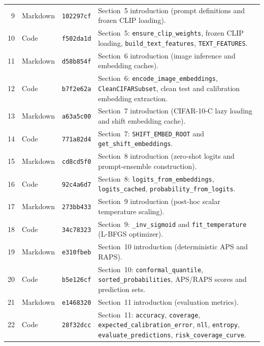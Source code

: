 \documentclass[11pt,a4paper]{article}
\begin{document}
{\begin{longtable}{r l l P{0.64\textwidth}}
9 & Markdown & \texttt{102297cf} & Section~5 introduction (prompt definitions and frozen CLIP loading). \\
10 & Code & \texttt{f502da1d} & Section~5: \texttt{ensure\_\allowbreak{}clip\_\allowbreak{}weights}, frozen CLIP loading, \texttt{build\_\allowbreak{}text\_\allowbreak{}features}, \texttt{TEXT\_\allowbreak{}FEATURES}. \\
11 & Markdown & \texttt{d58b854f} & Section~6 introduction (image inference and embedding caches). \\
12 & Code & \texttt{b7f2e62a} & Section~6: \texttt{encode\_\allowbreak{}image\_\allowbreak{}embeddings}, \texttt{CleanCIFARSubset}, clean test and calibration embedding extraction. \\
13 & Markdown & \texttt{a63a5c00} & Section~7 introduction (CIFAR-10-C lazy loading and shift embedding cache). \\
14 & Code & \texttt{771a82d4} & Section~7: \texttt{SHIFT\_\allowbreak{}EMBED\_\allowbreak{}ROOT} and \texttt{get\_\allowbreak{}shift\_\allowbreak{}embeddings}. \\
15 & Markdown & \texttt{cd8cd5f0} & Section~8 introduction (zero-shot logits and prompt-ensemble construction). \\
16 & Code & \texttt{92c4a6d7} & Section~8: \texttt{logits\_\allowbreak{}from\_\allowbreak{}embeddings}, \texttt{logits\_\allowbreak{}cached}, \texttt{probability\_\allowbreak{}from\_\allowbreak{}logits}. \\
17 & Markdown & \texttt{273bb433} & Section~9 introduction (post-hoc scalar temperature scaling). \\
18 & Code & \texttt{34c78323} & Section~9: \texttt{\_\allowbreak{}inv\_\allowbreak{}sigmoid} and \texttt{fit\_\allowbreak{}temperature} (L-BFGS optimizer). \\
19 & Markdown & \texttt{e310fbeb} & Section~10 introduction (deterministic APS and RAPS). \\
20 & Code & \texttt{b5e126cf} & Section~10: \texttt{conformal\_\allowbreak{}quantile}, \texttt{sorted\_\allowbreak{}probabilities}, APS/RAPS scores and prediction sets. \\
21 & Markdown & \texttt{e1468320} & Section~11 introduction (evaluation metrics). \\
22 & Code & \texttt{28f32dcc} & Section~11: \texttt{accuracy}, \texttt{coverage}, \texttt{expected\_\allowbreak{}calibration\_\allowbreak{}error}, \texttt{nll}, \texttt{entropy}, \texttt{evaluate\_\allowbreak{}predictions}, \texttt{risk\_\allowbreak{}coverage\_\allowbreak{}curve}. \\

\end{longtable}}
\end{document}
